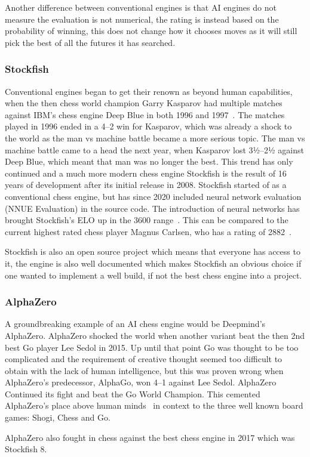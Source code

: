 Another difference between conventional engines is that AI engines do not measure the evaluation is not numerical, the
rating is instead based on the probability of winning, this does not change how it chooses moves as it will still pick
the best of all the futures it has searched.

\subsubsection{Stockfish}\label{subsubsec:stockfish}

Conventional engines began to get their renown as beyond human capabilities, when the then chess world champion
Garry Kasparov had multiple matches against IBM's chess engine Deep Blue in both 1996 and
1997~\cite{Garry-Kasparov-vs-Deep-Blue}.
The matches played in 1996 ended in a 4--2 win for Kasparov, which was already a shock to the world as the man vs
machine battle became a more serious topic.
The man vs machine battle came to a head the next year, when Kasparov lost 3½--2½ against Deep Blue, which meant that
man was no longer the best.
This trend has only continued and a much more modern chess engine Stockfish is the result of 16 years of development
after its initial release in 2008.
Stockfish started of as a conventional chess engine, but has since 2020 included neural network
evaluation (NNUE Evaluation) in the source code.
The introduction of neural networks has brought Stockfish's ELO up in the 3600 range~\cite{Stockfish}.
This can be compared to the current highest rated chess player Magnus Carlsen, who has a
rating of 2882~\cite{highest-ELO-chess-player}.

Stockfish is also an open source project which means that everyone has access to it, the engine is also well documented
which makes Stockfish an obvious choice if one wanted to implement a well build, if not the best chess engine into a
project.

\subsubsection{AlphaZero}\label{subsubsec:alphazero}

A groundbreaking example of an AI chess engine would be Deepmind's AlphaZero.
AlphaZero shocked the world when another variant beat the then 2nd best Go player Lee Sedol in 2015.
Up until that point Go was thought to be too complicated and the requirement of creative thought seemed too difficult
to obtain with the lack of human intelligence, but this was proven wrong when AlphaZero's predecessor, AlphaGo,
won 4--1 against Lee Sedol.
AlphaZero Continued its fight and beat the Go World Champion.
This cemented AlphaZero's place above human minds~\cite{alpha-go-zero} in context to the three well known board games:
Shogi, Chess and Go.

AlphaZero also fought in chess against the best chess engine in 2017 which was Stockfish 8.
